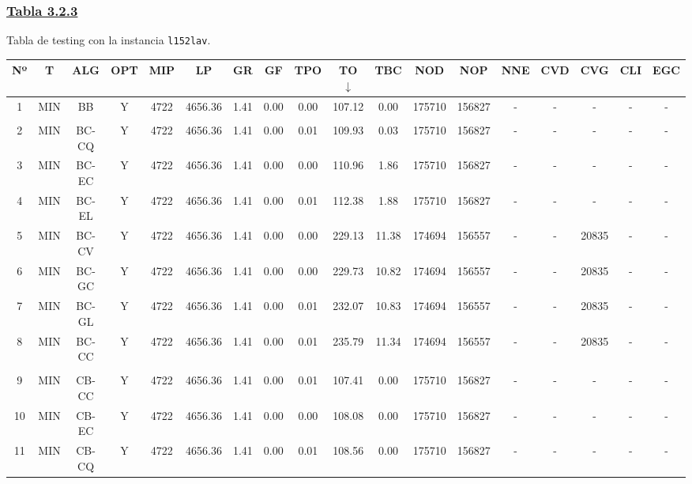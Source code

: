 \subsubsection*{\underline{Tabla 3.2.3}}
\noindent Tabla de testing con la instancia \verb_l152lav_.\\

{
\footnotesize\centering
\hspace*{-5mm}\begin{tabular}{ *{17}{c|} c }
\hline
\textbf{Nº} & \textbf{T} & \textbf{ALG} & \textbf{OPT} & \textbf{MIP} & \textbf{LP} & \textbf{GR} & \textbf{GF} & \textbf{TPO} & \textbf{TO} $\downarrow$ & \textbf{TBC} & \textbf{NOD} & \textbf{NOP} & \textbf{NNE} & \textbf{CVD} & \textbf{CVG} & \textbf{CLI} & \textbf{EGC}\\
\hline
1 & MIN & BB & Y & 4722 & 4656.36 & 1.41 & 0.00 & 0.00 & 107.12 & 0.00 & 175710 & 156827 & - & - & - & - & -\\
\hline
\multicolumn{18}{c}{}
\\
\hline
2 & MIN & BC-CQ & Y & 4722 & 4656.36 & 1.41 & 0.00 & 0.01 & 109.93 & 0.03 & 175710 & 156827 & - & - & - & - & -\\
\hline
3 & MIN & BC-EC & Y & 4722 & 4656.36 & 1.41 & 0.00 & 0.00 & 110.96 & 1.86 & 175710 & 156827 & - & - & - & - & -\\
\hline
4 & MIN & BC-EL & Y & 4722 & 4656.36 & 1.41 & 0.00 & 0.01 & 112.38 & 1.88 & 175710 & 156827 & - & - & - & - & -\\
\hline
5 & MIN & BC-CV & Y & 4722 & 4656.36 & 1.41 & 0.00 & 0.00 & 229.13 & 11.38 & 174694 & 156557 & - & - & 20835 & - & -\\
\hline
6 & MIN & BC-GC & Y & 4722 & 4656.36 & 1.41 & 0.00 & 0.00 & 229.73 & 10.82 & 174694 & 156557 & - & - & 20835 & - & -\\
\hline
7 & MIN & BC-GL & Y & 4722 & 4656.36 & 1.41 & 0.00 & 0.01 & 232.07 & 10.83 & 174694 & 156557 & - & - & 20835 & - & -\\
\hline
8 & MIN & BC-CC & Y & 4722 & 4656.36 & 1.41 & 0.00 & 0.01 & 235.79 & 11.34 & 174694 & 156557 & - & - & 20835 & - & -\\
\hline
\multicolumn{18}{c}{}
\\
\hline
9 & MIN & CB-CC & Y & 4722 & 4656.36 & 1.41 & 0.00 & 0.01 & 107.41 & 0.00 & 175710 & 156827 & - & - & - & - & -\\
\hline
10 & MIN & CB-EC & Y & 4722 & 4656.36 & 1.41 & 0.00 & 0.00 & 108.08 & 0.00 & 175710 & 156827 & - & - & - & - & -\\
\hline
11 & MIN & CB-CQ & Y & 4722 & 4656.36 & 1.41 & 0.00 & 0.01 & 108.56 & 0.00 & 175710 & 156827 & - & - & - & - & -\\

\end{tabular}}

